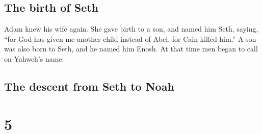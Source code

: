 \hypertarget{the-birth-of-seth}{%
\subsection{The birth of Seth}\label{the-birth-of-seth}}

 Adam knew his wife again. She gave birth to a son, and
named him Seth, saying, ``for God has given me another child instead of
Abel, for Cain killed him.''  A son was also born to
Seth, and he named him Enosh. At that time men began to call on Yahweh's
name.

\hypertarget{the-descent-from-seth-to-noah}{%
\subsection{The descent from Seth to
Noah}\label{the-descent-from-seth-to-noah}}

\hypertarget{section-4}{%
\section{5}\label{section-4}}

